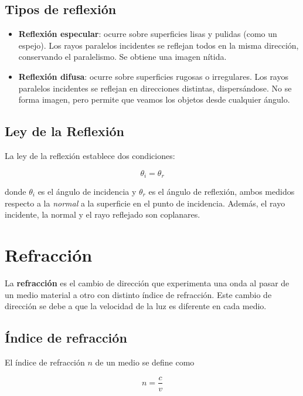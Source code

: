 \subsection{Tipos de reflexión}

\begin{itemize}
    \item \textbf{Reflexión especular}: ocurre sobre superficies lisas y pulidas (como un espejo). Los rayos paralelos incidentes se reflejan todos en la misma dirección, conservando el paralelismo. Se obtiene una imagen nítida.
    \item \textbf{Reflexión difusa}: ocurre sobre superficies rugosas o irregulares. Los rayos paralelos incidentes se reflejan en direcciones distintas, dispersándose. No se forma imagen, pero permite que veamos los objetos desde cualquier ángulo.
\end{itemize}



\subsection{Ley de la Reflexión}

La ley de la reflexión establece dos condiciones:

$$\theta_i = \theta_r$$

donde $\theta_i$ es el ángulo de incidencia y $\theta_r$ es el ángulo de reflexión, ambos medidos respecto a la \textit{normal} a la superficie en el punto de incidencia. Además, el rayo incidente, la normal y el rayo reflejado son coplanares.



\section{Refracción}

La \textbf{refracción} es el cambio de dirección que experimenta una onda al pasar de un medio material a otro con distinto índice de refracción. Este cambio de dirección se debe a que la velocidad de la luz es diferente en cada medio.

\subsection{Índice de refracción}

El índice de refracción $n$ de un medio se define como

$$n = \frac{c}{v}$$

